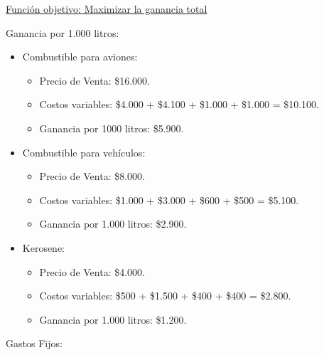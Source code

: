 \documentclass[10pt,a4paper]{article}
\begin{document}
\begin{enumerate}
\begin{itemize}
    \end{itemize}

    \underline{Función objetivo: Maximizar la ganancia total}

    \vspace{0.5em}

    Ganancia por 1.000 litros:

    \begin{itemize}

        \item Combustible para aviones:
        \begin{itemize}

            \item Precio de Venta: \$16.000.
            \item Costos variables: \$4.000 + \$4.100 + \$1.000 + \$1.000 = \$10.100.
            \item Ganancia por 1000 litros: \$5.900. \\
    
        \end{itemize}

        \item Combustible para vehículos:
        \begin{itemize}

            \item Precio de Venta: \$8.000.
            \item Costos variables: \$1.000 + \$3.000 + \$600 + \$500 = \$5.100.
            \item Ganancia por 1.000 litros: \$2.900. \\
    
        \end{itemize}

        \item Kerosene:
        \begin{itemize}

            \item Precio de Venta: \$4.000.
            \item Costos variables: \$500 + \$1.500 + \$400 + \$400 = \$2.800.
            \item Ganancia por 1.000 litros: \$1.200. \\
    
        \end{itemize}

    \end{itemize}


    Gastos Fijos:


\end{enumerate}
\end{document}
